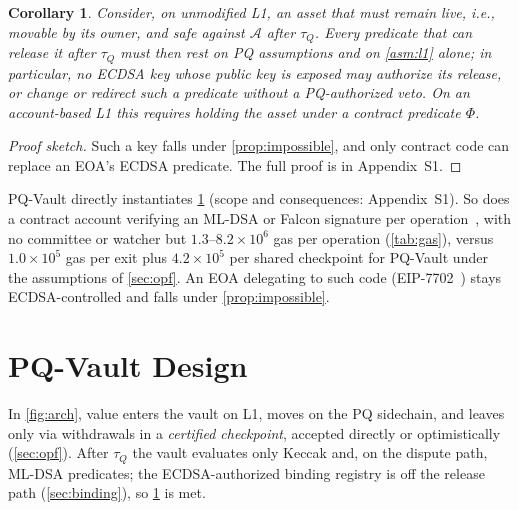 \documentclass[10pt,journal,compsoc]{IEEEtran}
\theoremstyle{tplain}
\newtheorem{corollary}[theorem]{Corollary}
\theoremstyle{tdef}
\theoremstyle{remark}
\newcommand{\supp}[1]{Appendix~#1}
\begin{document}
\begin{corollary}\label{cor:vault}
Consider, on unmodified L1, an asset that must remain \emph{live}, i.e., movable by its owner, and \emph{safe} against $\mathcal{A}$ after $\tau_Q$. Every predicate that can release it after $\tau_Q$ must then rest on PQ assumptions and on \cref{asm:l1} alone; in particular, no ECDSA key whose public key is exposed may authorize its release, or change or redirect such a predicate without a PQ-authorized veto. On an account-based L1 this requires holding the asset under a contract predicate $\Phi$.
\end{corollary}
\begin{proof}[Proof sketch]
Such a key falls under \cref{prop:impossible}, and only contract code can replace an EOA's ECDSA predicate. The full proof is in \supp{S1}.
\end{proof}

\noindent PQ-Vault directly instantiates \cref{cor:vault} (scope and consequences: \supp{S1}). So does a contract account verifying an ML-DSA or Falcon signature per operation~\cite{zknox_dilithium,zknox_falcon}, with no committee or watcher but $1.3$--$8.2\times10^{6}$ gas per operation (\cref{tab:gas}), versus $1.0\times10^{5}$ gas per exit plus $4.2\times10^{5}$ per shared checkpoint for PQ-Vault under the assumptions of \cref{sec:opf}. An EOA delegating to such code (EIP-7702~\cite{eip7702}) stays ECDSA-controlled and falls under \cref{prop:impossible}.

\section{PQ-Vault Design}\label{sec:design}

In \cref{fig:arch}, value enters the vault on L1, moves on the PQ sidechain, and leaves only via withdrawals in a \emph{certified checkpoint}, accepted directly or optimistically (\cref{sec:opf}). After $\tau_Q$ the vault evaluates only Keccak and, on the dispute path, ML-DSA predicates; the ECDSA-authorized binding registry is off the release path (\cref{sec:binding}), so \cref{cor:vault} is met.
\end{document}
